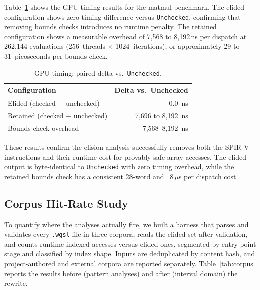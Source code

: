 \documentclass[11pt,a4paper]{article}
\begin{document}
Table~\ref{tab:gpu_timing} shows the GPU timing results for the matmul
benchmark. The elided configuration shows zero timing difference versus
\texttt{Unchecked}, confirming that removing bounds checks introduces no
runtime penalty. The retained configuration shows a measurable overhead of
7,568 to 8,192\,ns per dispatch at 262,144 evaluations (256~threads $\times$
1024~iterations), or approximately 29 to 31~picoseconds per bounds check.

\begin{table}[htbp]
\centering
\caption{GPU timing: paired delta vs.\ \texttt{Unchecked}.}
\label{tab:gpu_timing}
\small
\begin{tabular}{lr}
\toprule
Configuration & Delta vs.\ Unchecked \\
\midrule
Elided (checked $-$ unchecked) & 0.0~ns \\
Retained (checked $-$ unchecked) & 7,696 to 8,192~ns \\
\midrule
Bounds check overhead & 7,568--8,192~ns \\
\bottomrule
\end{tabular}
\end{table}

These results confirm the elision analysis successfully removes both the
SPIR-V instructions and their runtime cost for provably-safe array accesses.
The elided output is byte-identical to \texttt{Unchecked} with zero timing
overhead, while the retained bounds check has a consistent 28-word and
~8\,$\mu$s per dispatch cost.

\subsection{Corpus Hit-Rate Study}
\label{sec:corpus}

To quantify where the analyses actually fire, we built a harness that
parses and validates every \texttt{.wgsl} file in three corpora, reads the
elided set after validation, and counts runtime-indexed accesses versus
elided ones, segmented by entry-point stage and classified by index shape.
Inputs are deduplicated by content hash, and project-authored and external
corpora are reported separately. Table~\ref{tab:corpus} reports the results
before (pattern analyses) and after (interval domain) the rewrite.
\end{document}
